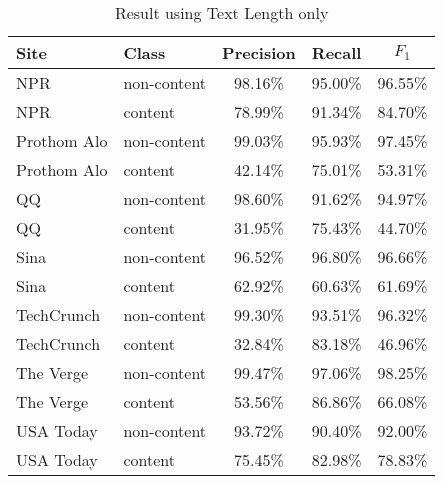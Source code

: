 \documentclass{acm_proc_article-sp}
\begin{document}
\begin{table}
\centering
\caption{\label{table:textlength}Result using Text Length only}
\begin{tabular}{|l|l|c|c|c|} \hline
Site&Class&Precision&Recall&$F_1$\\ \hline\hline
NPR&non-content&98.16\%&95.00\%&96.55\%\\ \hline
NPR&content&78.99\%&91.34\%&84.70\%\\ \hline
Prothom Alo&non-content&99.03\%&95.93\%&97.45\%\\ \hline
Prothom Alo&content&42.14\%&75.01\%&53.31\%\\ \hline
QQ&non-content&98.60\%&91.62\%&94.97\%\\ \hline
QQ&content&31.95\%&75.43\%&44.70\%\\ \hline
Sina&non-content&96.52\%&96.80\%&96.66\%\\ \hline
Sina&content&62.92\%&60.63\%&61.69\%\\ \hline
TechCrunch&non-content&99.30\%&93.51\%&96.32\%\\ \hline
TechCrunch&content&32.84\%&83.18\%&46.96\%\\ \hline
The Verge&non-content&99.47\%&97.06\%&98.25\%\\ \hline
The Verge&content&53.56\%&86.86\%&66.08\%\\ \hline
USA Today&non-content&93.72\%&90.40\%&92.00\%\\ \hline
USA Today&content&75.45\%&82.98\%&78.83\%\\ \hline
\end{tabular}
\end{table}
\end{document}
